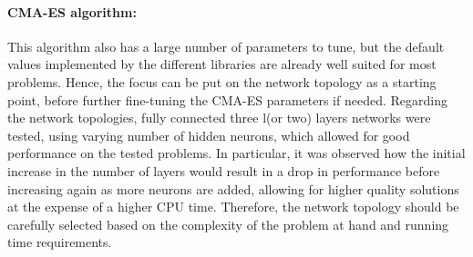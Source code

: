 \paragraph{CMA-ES algorithm:} This algorithm also has a large number of parameters to tune, but the default values implemented by the different libraries are already well suited for most
problems. Hence, the focus can be put on the network topology as a starting point, before further fine-tuning the CMA-ES parameters if needed. Regarding the network topologies, fully
connected three l(or two) layers networks were tested, using varying number of hidden neurons, which allowed for good performance on the tested problems. In particular, it was observed how
the initial increase in the number of layers would result in a drop in performance before increasing again as more neurons are added, allowing for higher quality solutions at the expense
of a higher CPU time. Therefore, the network topology should be carefully selected based on the complexity of the problem at hand and running time requirements.
